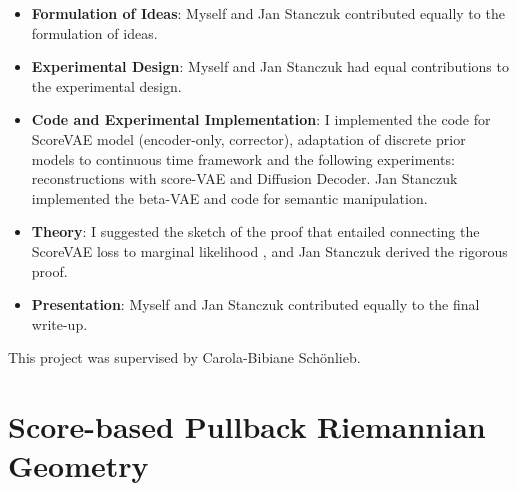 \begin{itemize}
\item \textbf{Formulation of Ideas}: Myself and Jan Stanczuk contributed equally to the formulation of ideas.
\item \textbf{Experimental Design}: Myself and Jan Stanczuk had equal contributions to the experimental design.
\item \textbf{Code and Experimental Implementation}: I implemented the code for ScoreVAE model (encoder-only, corrector), adaptation of discrete prior models to continuous time framework and the following experiments: reconstructions with score-VAE and Diffusion Decoder. Jan Stanczuk implemented the beta-VAE and code for semantic manipulation.
\item \textbf{Theory}: I suggested the sketch of the proof that entailed connecting the ScoreVAE loss to marginal likelihood \cite{song2021maximum}, and Jan Stanczuk derived the rigorous proof.
\item \textbf{Presentation}: Myself and Jan Stanczuk contributed equally to the final write-up.
\end{itemize}

This project was supervised by Carola-Bibiane Sch\"onlieb.

\section{Score-based Pullback Riemannian Geometry}

